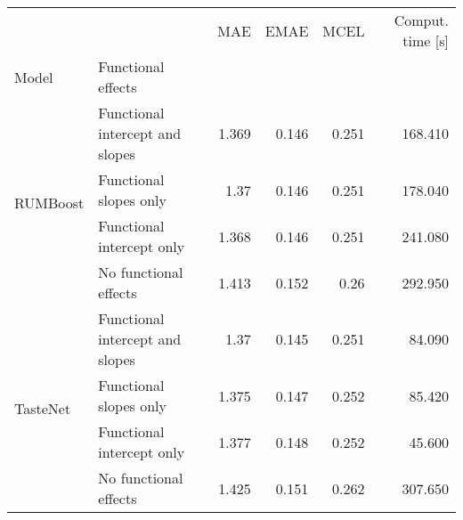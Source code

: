 \begin{tabular}{llrrrr}
\toprule
 &  & MAE & EMAE & MCEL & Comput. time [s] \\
Model & Functional effects &  &  &  &  \\
\midrule
\multirow[t]{4}{*}{RUMBoost} & Functional intercept and slopes & 1.369 & 0.146 & 0.251 & 168.410 \\
 & Functional slopes only & 1.37 & 0.146 & 0.251 & 178.040 \\
 & Functional intercept only & 1.368 & 0.146 & 0.251 & 241.080 \\
 & No functional effects & 1.413 & 0.152 & 0.26 & 292.950 \\
\cline{1-6}
\multirow[t]{4}{*}{TasteNet} & Functional intercept and slopes & 1.37 & 0.145 & 0.251 & 84.090 \\
 & Functional slopes only & 1.375 & 0.147 & 0.252 & 85.420 \\
 & Functional intercept only & 1.377 & 0.148 & 0.252 & 45.600 \\
 & No functional effects & 1.425 & 0.151 & 0.262 & 307.650 \\
\cline{1-6}
\bottomrule
\end{tabular}
